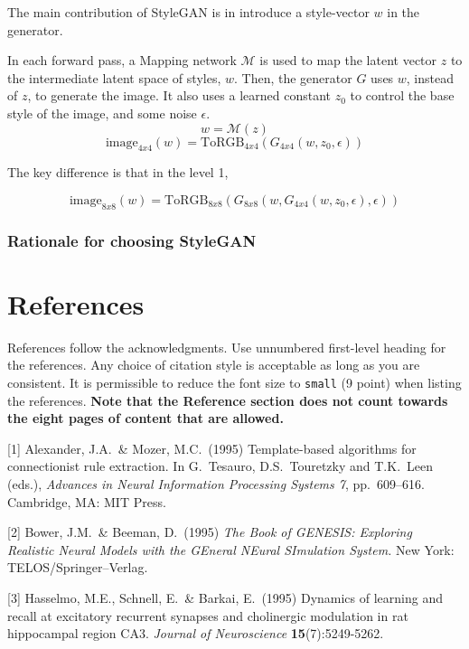 \documentclass{article}
\begin{document}
The main contribution of StyleGAN is in introduce a style-vector $w$ in the generator.

In each forward pass, a Mapping network $\mathcal{M}$ is used to map the latent vector $z$ to the intermediate latent space of styles, $w$.
Then, the generator $G$ uses $w$, instead of $z$, to generate the image. It also uses a learned constant $z_0$ to control the base style of the image, and some noise $\epsilon$.
\[w = \mathcal{M}(z)\]
\[\text{image}_{4x4}(w) = \text{ToRGB}_{4x4}(G_{4x4}(w, z_0, \epsilon))\]

The key difference is that in the level 1, 

\[\text{image}_{8x8}(w) = \text{ToRGB}_{8x8}(G_{8x8}(w, G_{4x4}(w, z_0, \epsilon), \epsilon))\]


\subsubsection*{Rationale for choosing StyleGAN}

\section*{References}

References follow the acknowledgments. Use unnumbered first-level heading for
the references. Any choice of citation style is acceptable as long as you are
consistent. It is permissible to reduce the font size to \verb+small+ (9 point)
when listing the references.
{\bf Note that the Reference section does not count towards the eight pages of content that are allowed.}
\medskip

\small

[1] Alexander, J.A.\ \& Mozer, M.C.\ (1995) Template-based algorithms for
connectionist rule extraction. In G.\ Tesauro, D.S.\ Touretzky and T.K.\ Leen
(eds.), {\it Advances in Neural Information Processing Systems 7},
pp.\ 609--616. Cambridge, MA: MIT Press.

[2] Bower, J.M.\ \& Beeman, D.\ (1995) {\it The Book of GENESIS: Exploring
  Realistic Neural Models with the GEneral NEural SImulation System.}  New York:
TELOS/Springer--Verlag.

[3] Hasselmo, M.E., Schnell, E.\ \& Barkai, E.\ (1995) Dynamics of learning and
recall at excitatory recurrent synapses and cholinergic modulation in rat
hippocampal region CA3. {\it Journal of Neuroscience} {\bf 15}(7):5249-5262.
\end{document}
